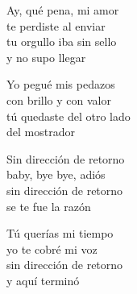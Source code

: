\begin{lyrics}
Ay, qué pena, mi amor\\
te perdiste al enviar\\
tu orgullo iba sin sello\\
y no supo llegar

Yo pegué mis pedazos\\
con brillo y con valor\\
tú quedaste del otro lado\\
del mostrador

Sin dirección de retorno\\
baby, bye bye, adiós\\
sin dirección de retorno\\
se te fue la razón

Tú querías mi tiempo\\
yo te cobré mi voz\\
sin dirección de retorno\\
y aquí terminó
\end{lyrics}


